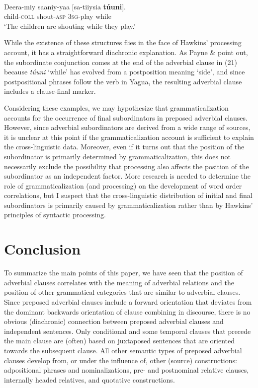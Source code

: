 \documentclass[output=paper]{langsci/langscibook}
\begin{document}
\ea\label{ex:key:}
\\
\gll   Deera-miy  saaniy-yaa  [sa-tiiysia  \textbf{túuni}].\\
       child-\textsc{coll}  shout-\textsc{asp}  3\textsc{sg}-play  while\\
\glt   `The children are shouting while they play.'
\z

While the existence of these structures flies in the face of Hawkins’ processing account, it has a straightforward diachronic explanation. As Payne \& \citet[340]{Payne1990} point out, the subordinate conjunction comes at the end of the adverbial clause in (21) because \textit{túuni} ‘while’ has evolved from a postposition meaning ‘side’, and since postpositional phrases follow the verb in Yagua, the resulting adverbial clause includes a clause-final marker.

Considering these examples, we may hypothesize that grammaticalization accounts for the occurrence of final subordinators in preposed adverbial clauses. However, since adverbial subordinators are derived from a wide range of sources, it is unclear at this point if the grammaticalization account is sufficient to explain the cross-linguistic data. Moreover, even if it turns out that the position of the subordinator is primarily determined by grammaticalization, this does not necessarily exclude the possibility that processing also affects the position of the subordinator as an independent factor. More research is needed to determine the role of grammaticalization (and processing) on the development of word order correlations, but I suspect that the cross-linguistic distribution of initial and final subordinators is primarily caused by grammaticalization rather than by Hawkins’ principles of syntactic processing.

\section{Conclusion}

To summarize the main points of this paper, we have seen that the position of adverbial clauses correlates with the meaning of adverbial relations and the position of other grammatical categories that are similar to adverbial clauses. Since preposed adverbial clauses include a forward orientation that deviates from the dominant backwards orientation of clause combining in discourse, there is no obvious (diachronic) connection between preposed adverbial clauses and independent sentences. Only conditional and some temporal clauses that precede the main clause are (often) based on juxtaposed sentences that are oriented towards the subsequent clause. All other semantic types of preposed adverbial clauses develop from, or under the influence of, other (source) constructions: adpositional phrases and nominalizations, pre- and postnominal relative clauses, internally headed relatives, and quotative constructions.
\end{document}
